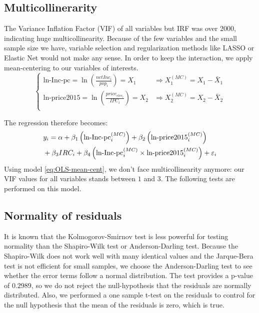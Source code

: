 \subsection{Multicollinerarity}
The Variance Inflation Factor (VIF) of all variables but IRF was over $2000$, indicating huge multicollinearity. Because of the few variables and the small sample size we have, variable selection and regularization methods like LASSO or Elastic Net would not make any sense. In order to keep the interaction, we apply mean-centering to our variables of interests.
\begin{equation} \label{eq:mean-cent-operator}
    \begin{cases}
    \text{ln-Inc-pc} = \ln{\left(\frac{{netInc_i}}{pop_i}\right)} = X_1 & \Rightarrow {X}_1^{(MC)} = X_1 - \bar{X}_1\\
    \text{ln-price2015} = \ln{\left(\frac{price_{elec_i}}{IPC_i}\right)} = X_2 & \Rightarrow {X}_2^{(MC)} = X_2 - \bar{X}_2\\
    \end{cases}
\end{equation}

The regression therefore becomes: 
\begin{align} \label{eq:OLS-mean-cent}
    & y_i = \alpha + \beta_1 \left(\text{ln-Inc-pc}_i^{(MC)}\right) + \beta_2 \left(\text{ln-price2015}_i^{(MC)}\right) \notag \\
    & + \beta_3 IRC_i + \beta_4 \left(\text{ln-Inc-pc}_i^{(MC)} \times \text{ln-price2015}_i^{(MC)}\right) + \varepsilon_i
\end{align}
Using model \eqref{eq:OLS-mean-cent}, we don't face multicollinearity anymore: our VIF values for all variables stands between $1$ and $3$. The following tests are performed on this model.

\subsection{Normality of residuals}
It is known that the Kolmogorov-Smirnov test is less powerful for testing normality than the Shapiro-Wilk test or Anderson-Darling test. Because the Shapiro-Wilk does not work well with many identical values and the Jarque-Bera test is not efficient for small samples, we choose the Anderson-Darling test to see whether the error terms follow a normal distribution. The test provides a p-value of $0.2989$, so we do not reject the null-hypothesis that the residuals are normally distributed. Also, we performed a one sample t-test on the residuals to control for the null hypothesis that the mean of the residuals is zero, which is true.

